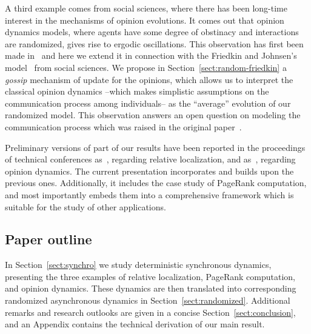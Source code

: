 \documentclass{IEEEtran}
\newcommand{\1}{\mathbf{1}} \newcommand{\ind}{\mathds{1}}
\begin{document}
A third example comes from social sciences, where there has been long-time interest in the mechanisms of opinion evolutions. It comes out that opinion dynamics models, where agents have some degree of obstinacy and interactions are randomized, gives rise to ergodic oscillations. This observation has first been made in~\cite{DA-GC-FF-AO:11} and here we extend it in connection with the Friedkin and Johnsen's model~\cite{NEF-ECJ:99} from social sciences. We propose in Section~\ref{sect:random-friedkin} a {\it gossip} mechanism of update for the opinions, which allows us to interpret the classical opinion dynamics --which makes simplistic assumptions on the communication process among individuals-- as the ``average'' evolution of our randomized model. This observation answers an open question on modeling the communication process which was raised in the original paper~\cite{NEF-ECJ:99}.

Preliminary versions of part of our results have been reported in the proceedings of technical conferences as~\cite{CR-PF-HI-RT:13a,CR-PF-RT-HI:13b}, regarding relative localization, and as~\cite{PF-CR-RT-HI:13c}, regarding opinion dynamics. 
The current presentation incorporates and builds upon the previous ones. Additionally, it includes the case study of PageRank computation, and most importantly embeds them into a comprehensive framework which is suitable for the study of other applications. 



\subsection{Paper outline} In Section~\ref{sect:synchro} we study deterministic synchronous dynamics, presenting the three examples of relative localization, PageRank computation, and opinion dynamics. These dynamics are then translated into corresponding randomized asynchronous dynamics in Section~\ref{sect:randomized}. Additional remarks and research outlooks are given in a concise Section~\ref{sect:conclusion}, and an Appendix contains the technical derivation of our main result.
\end{document}
